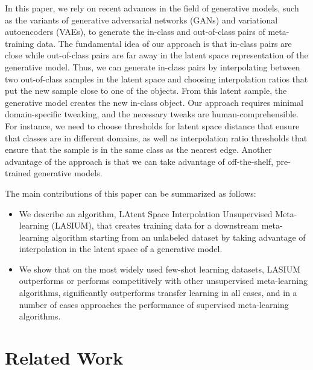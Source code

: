 \documentclass{article}
\begin{document}
In this paper, we rely on recent advances in the field of generative models, such as the variants of generative adversarial networks (GANs) and variational autoencoders (VAEs), to generate the in-class and out-of-class pairs of meta-training data. The fundamental idea of our approach is that in-class pairs are close while out-of-class pairs are far away in the latent space representation of the generative model. Thus, we can generate in-class pairs by interpolating between two out-of-class samples in the latent space and choosing interpolation ratios that put the new sample close to one of the objects. From this latent sample, the generative model creates the new in-class object. Our approach requires minimal domain-specific tweaking, and the necessary tweaks are human-comprehensible. For instance, we need to choose thresholds for latent space distance that ensure that classes are in different domains, as well as interpolation ratio thresholds that ensure that the sample is in the same class as the nearest edge. Another advantage of the approach is that we can take advantage of off-the-shelf, pre-trained generative models. 

The main contributions of this paper can be summarized as follows:

\begin{itemize}
    \item We describe an algorithm, LAtent Space Interpolation Unsupervised Meta-learning (LASIUM), that creates training data for a downstream meta-learning algorithm starting from an unlabeled dataset by taking advantage of interpolation in the latent space of a generative model. 

    \item We show that on the most widely used few-shot learning datasets, LASIUM outperforms or performs competitively with other unsupervised meta-learning algorithms, significantly outperforms transfer learning in all cases, and in a number of cases approaches the performance of supervised meta-learning algorithms. 
\end{itemize}
 \section{Related Work}
\end{document}
